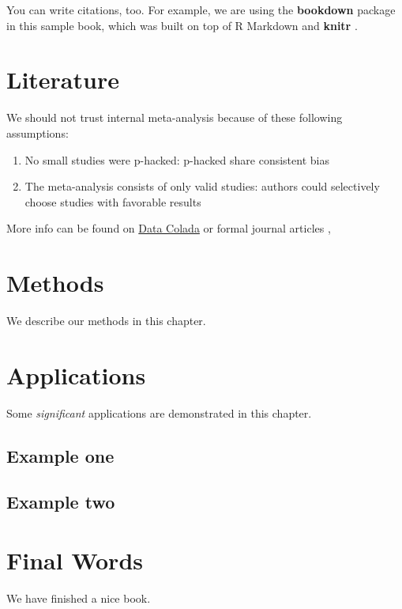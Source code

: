 \documentclass[
]{book}
\providecommand{\tightlist}{%
  \setlength{\itemsep}{0pt}\setlength{\parskip}{0pt}}
\begin{document}
You can write citations, too. For example, we are using the \textbf{bookdown} package \citep{R-bookdown} in this sample book, which was built on top of R Markdown and \textbf{knitr} \citep{xie2015}.

\hypertarget{literature}{%
\chapter{Literature}\label{literature}}

We should not trust internal meta-analysis because of these following assumptions:

\begin{enumerate}
\def\labelenumi{\arabic{enumi}.}
\tightlist
\item
  No small studies were p-hacked: p-hacked share consistent bias
\item
  The meta-analysis consists of only valid studies: authors could selectively choose studies with favorable results
\end{enumerate}

More info can be found on \href{https://datacolada.org/73}{Data Colada} or formal journal articles \citep{Vosgerau_2019}, \citep{Simmons_2014}

\hypertarget{methods}{%
\chapter{Methods}\label{methods}}

We describe our methods in this chapter.

\hypertarget{applications}{%
\chapter{Applications}\label{applications}}

Some \emph{significant} applications are demonstrated in this chapter.

\hypertarget{example-one}{%
\section{Example one}\label{example-one}}

\hypertarget{example-two}{%
\section{Example two}\label{example-two}}

\hypertarget{final-words}{%
\chapter{Final Words}\label{final-words}}

We have finished a nice book.

  
\end{document}
